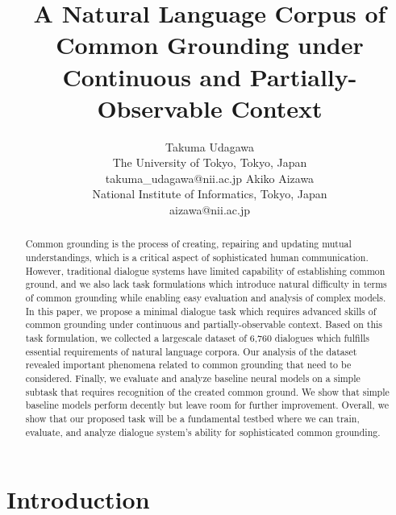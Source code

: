 \documentclass[letterpaper]{article}
\title{A Natural Language Corpus of Common Grounding under \\ Continuous and Partially-Observable Context}
\author{Takuma Udagawa\\
{The University of Tokyo, Tokyo, Japan}\\
{takuma\_udagawa@nii.ac.jp}
\And
Akiko Aizawa\\
{National Institute of Informatics, Tokyo, Japan}\\
{aizawa@nii.ac.jp}
}
\begin{document}
\maketitle
\begin{abstract}
Common grounding is the process of creating, repairing and updating mutual understandings, which is a critical aspect of sophisticated human communication. However, traditional dialogue systems have limited capability of establishing common ground, and we also lack task formulations which introduce natural difficulty in terms of common grounding while enabling easy evaluation and analysis of complex models. In this paper, we propose a minimal dialogue task which requires advanced skills of common grounding under continuous and partially-observable context. Based on this task formulation, we collected a largescale dataset of 6,760 dialogues which fulfills essential requirements of natural language corpora. Our analysis of the dataset revealed important phenomena related to common grounding that need to be considered. Finally, we evaluate and analyze baseline neural models on a simple subtask that requires recognition of the created common ground. We show that simple baseline models perform decently but leave room for further improvement. Overall, we show that our proposed task will be a fundamental testbed where we can train, evaluate, and analyze dialogue system's ability for sophisticated common grounding.
\end{abstract}

\section{Introduction}
\label{section:introduction}
\end{document}
